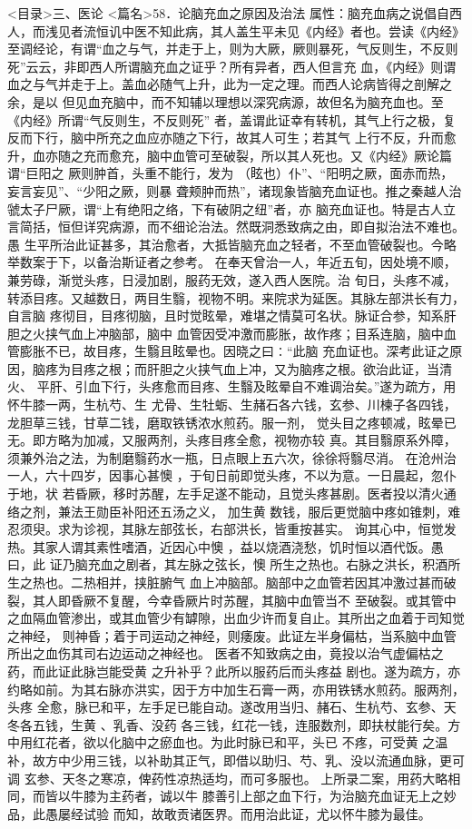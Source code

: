 \documentclass[a4paper,12pt,UTF8,twoside]{ctexbook}
\begin{document}
<目录>三、医论
<篇名>58．论脑充血之原因及治法
属性：脑充血病之说倡自西人，而浅见者流恒讥中医不知此病，其人盖生平未见《内经》者也。尝读《内经》 
至调经论，有谓“血之与气，并走于上，则为大厥，厥则暴死，气反则生，不反则 
死”云云，非即西人所谓脑充血之证乎？所有异者，西人但言充 
血，《内经》则谓血之与气并走于上。盖血必随气上升，此为一定之理。而西人论病皆得之剖解之余，是以 
但见血充脑中，而不知辅以理想以深究病源，故但名为脑充血也。至《内经》所谓“气反则生，不反则死” 
者，盖谓此证幸有转机，其气上行之极，复反而下行，脑中所充之血应亦随之下行，故其人可生；若其气 
上行不反，升而愈升，血亦随之充而愈充，脑中血管可至破裂，所以其人死也。又《内经》厥论篇谓“巨阳之 
厥则肿首，头重不能行，发为 （眩也）仆”、“阳明之厥，面赤而热，妄言妄见”、“少阳之厥，则暴 
聋颊肿而热”，诸现象皆脑充血证也。推之秦越人治虢太子尸厥，谓“上有绝阳之络，下有破阴之纽”者，亦 
脑充血证也。特是古人立言简括，恒但详究病源，而不细论治法。然既洞悉致病之由，即自拟治法不难也。愚 
生平所治此证甚多，其治愈者，大抵皆脑充血之轻者，不至血管破裂也。今略举数案于下，以备治斯证者之参考。 
在奉天曾治一人，年近五旬，因处境不顺，兼劳碌，渐觉头疼，日浸加剧，服药无效，遂入西人医院。治 
旬日，头疼不减，转添目疼。又越数日，两目生翳，视物不明。来院求为延医。其脉左部洪长有力，自言脑 
疼彻目，目疼彻脑，且时觉眩晕，难堪之情莫可名状。脉证合参，知系肝胆之火挟气血上冲脑部，脑中 
血管因受冲激而膨胀，故作疼；目系连脑，脑中血管膨胀不已，故目疼，生翳且眩晕也。因晓之曰∶“此脑 
充血证也。深考此证之原因，脑疼为目疼之根；而肝胆之火挟气血上冲，又为脑疼之根。欲治此证，当清火、 
平肝、引血下行，头疼愈而目疼、生翳及眩晕自不难调治矣。”遂为疏方，用怀牛膝一两，生杭芍、生 
尤骨、生牡蛎、生赭石各六钱，玄参、川楝子各四钱，龙胆草三钱，甘草二钱，磨取铁锈浓水煎药。服一剂， 
觉头目之疼顿减，眩晕已无。即方略为加减，又服两剂，头疼目疼全愈，视物亦较 
真。其目翳原系外障，须兼外治之法，为制磨翳药水一瓶，日点眼上五六次，徐徐将翳尽消。 
在沧州治一人，六十四岁，因事心甚懊 ，于旬日前即觉头疼，不以为意。一日晨起，忽仆于地，状 
若昏厥，移时苏醒，左手足遂不能动，且觉头疼甚剧。医者投以清火通络之剂，兼法王勋臣补阳还五汤之义， 
加生黄 数钱，服后更觉脑中疼如锥刺，难忍须臾。求为诊视，其脉左部弦长，右部洪长，皆重按甚实。 
询其心中，恒觉发热。其家人谓其素性嗜酒，近因心中懊 ，益以烧酒浇愁，饥时恒以酒代饭。愚曰，此 
证乃脑充血之剧者，其左脉之弦长，懊 所生之热也。右脉之洪长，积酒所生之热也。二热相并，挟脏腑气 
血上冲脑部。脑部中之血管若因其冲激过甚而破裂，其人即昏厥不复醒，今幸昏厥片时苏醒，其脑中血管当不 
至破裂。或其管中之血隔血管渗出，或其血管少有罅隙，出血少许而复自止。其所出之血着于司知觉之神经， 
则神昏；着于司运动之神经，则痿废。此证左半身偏枯，当系脑中血管所出之血伤其司右边运动之神经也。 
医者不知致病之由，竟投以治气虚偏枯之药，而此证此脉岂能受黄 之升补乎？此所以服药后而头疼益 
剧也。遂为疏方，亦约略如前。为其右脉亦洪实，因于方中加生石膏一两，亦用铁锈水煎药。服两剂，头疼 
全愈，脉已和平，左手足已能自动。遂改用当归、赭石、生杭芍、玄参、天冬各五钱，生黄 、乳香、没药 
各三钱，红花一钱，连服数剂，即扶杖能行矣。方中用红花者，欲以化脑中之瘀血也。为此时脉已和平，头已 
不疼，可受黄 之温补，故方中少用三钱，以补助其正气，即借以助归、芍、乳、没以流通血脉，更可调 
玄参、天冬之寒凉，俾药性凉热适均，而可多服也。 
上所录二案，用药大略相同，而皆以牛膝为主药者，诚以牛 
膝善引上部之血下行，为治脑充血证无上之妙品，此愚屡经试验 
而知，故敢贡诸医界。而用治此证，尤以怀牛膝为最佳。 
\end{document}
